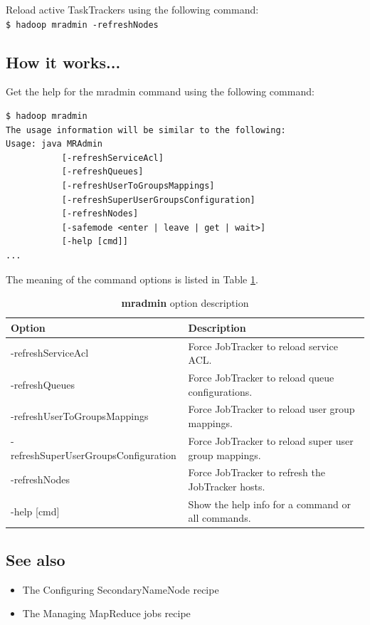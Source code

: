 Reload active TaskTrackers using the following command:\\
\verb|$ hadoop mradmin -refreshNodes|

\subsection*{How it works...}
Get the help for the mradmin command using the following command:
\lstset{style=bashstyle}
\begin{lstlisting}
$ hadoop mradmin
The usage information will be similar to the following:
Usage: java MRAdmin
           [-refreshServiceAcl]
           [-refreshQueues]
           [-refreshUserToGroupsMappings]
           [-refreshSuperUserGroupsConfiguration]
           [-refreshNodes]
           [-safemode <enter | leave | get | wait>]
           [-help [cmd]]
...
\end{lstlisting}

The meaning of the command options is listed in Table \ref{tbl:mradmin}.
\begin{table}
  \centering
  \small
  \begin{tabular}{ll}
    \toprule 
    \textbf{Option} & \textbf{Description} \\  \midrule
    -refreshServiceAcl & Force JobTracker to reload service ACL. \\
    -refreshQueues & Force JobTracker to reload queue configurations. \\
    -refreshUserToGroupsMappings & Force JobTracker to reload user group mappings. \\
    -refreshSuperUserGroupsConfiguration & Force JobTracker to reload super user group mappings. \\
    -refreshNodes & Force JobTracker to refresh the JobTracker hosts. \\
    -help [cmd] & Show the help info for a command or all commands. \\ \bottomrule
  \end{tabular} 
  \caption{\textbf{mradmin} option description}\label{tbl:mradmin}
\end{table}

\subsection*{See also}
\begin{itemize}
\item The Configuring SecondaryNameNode recipe
\item The Managing MapReduce jobs recipe
\end{itemize} 

